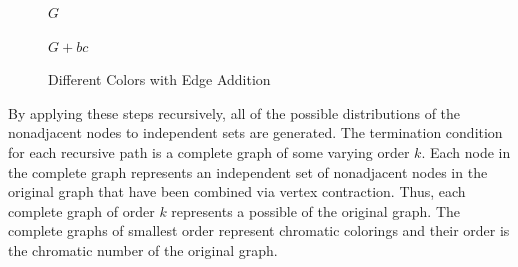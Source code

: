 \begin{figure}[h]
  \label{fig:zeadd}
  \begin{center}
    \begin{minipage}{2in}
      \begin{center}

        \bigskip

        \(G\)
      \end{center}
    \end{minipage}
    \begin{minipage}{2in}
      \begin{center}

        \bigskip

        \(G+bc\)
      \end{center}
    \end{minipage}
  \end{center}
  \caption{Different Colors with Edge Addition}
\end{figure}

By applying these steps recursively, all of the possible distributions of the nonadjacent nodes to independent sets
are generated.  The termination condition for each recursive path is a complete graph of some varying order \(k\).
Each node in the complete graph represents an independent set of nonadjacent nodes in the original graph that have
been combined via vertex contraction.  Thus, each complete graph of order \(k\) represents a possible 
of the original graph.  The complete graphs of smallest order represent chromatic colorings and their order is the
chromatic number of the original graph.

